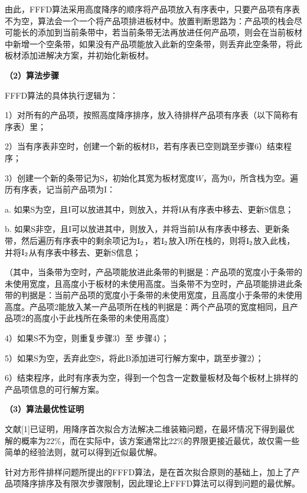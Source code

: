 \documentclass[bwprint]{gmcmthesis}
\begin{document}
	由此，FFFD算法采用高度降序的顺序将产品项放入有序表中，只要产品项有序表不为空，算法会一个一个将产品项排进板材中。放置判断思路为：产品项的栈会尽可能长的添加到当前条带中，若当前条带无法再放进任何产品项，则会在当前板材中新增一个空条带，如果没有产品项能放入此新的空条带，则丢弃此空条带，将此板材添加进解决方案，并初始化新板材。
	
	\textbf{（2）算法步骤}	
	
	FFFD算法的具体执行逻辑为：
	
	1）对所有的产品项，按照高度降序排序，放入待排样产品项有序表（以下简称有序表）里；
	
	2）当有序表非空时，创建一个新的板材B，若有序表已空则跳至步骤6）结束程序；
	
	3）创建一个新的条带记为S，初始化其宽为板材宽度$W$，高为0，所含栈为空。遍历有序表，记当前产品项为I：
	
	a. 如果S为空，且I可以放进其中，则放入，并将I从有序表中移去、更新S信息；
	
	b. 如果S非空，且I可以放进其中，则放入，并将当前I从有序表中移去、更新条带，然后遍历有序表中的剩余项记为$\rm{I}_2$，若$\rm{I}_2$放入I所在栈的，则将$\rm{I}_2$放入此栈，并将$\rm{I}_2$从有序表中移去、更新S信息；
	
	（其中，当条带为空时，产品项能放进此条带的判据是：产品项的宽度小于条带的未使用宽度，且高度小于板材的未使用高度。当条带不为空时，产品项能排进此条带的判据是：当前产品项的宽度小于条带的未使用宽度，且高度小于条带的未使用高度。产品项2能放入某一产品项所在栈的判据是：两个产品项的宽度相同，且产品项2的高度小于此栈所在条带的未使用高度）
	
	4）如果S不为空，则重复步骤3）至 步骤4）；
	
	5）如果S为空，丢弃此空S，将此B添加进可行解方案中，跳至步骤2）；
	
	6）结束程序，此时有序表为空，得到一个包含一定数量板材及每个板材上排样的产品项信息的可行解方案。
	
	
	\textbf{（3）算法最优性证明 }	
	
	文献[1]已证明，用降序首次拟合方法解决二维装箱问题，在最坏情况下得到最优解的概率为22\%，而在实际中，该方案通常比22\%的界限更接近最优，故仅需一些简单的经验法则，就可以得到近似最优解。
	
	
	针对方形件排样问题所提出的FFFD算法，是在首次拟合原则的基础上，加上了产品项降序排序及有限次步骤限制，因此理论上FFFD算法可以得到问题的最优解。
	
\end{document}
